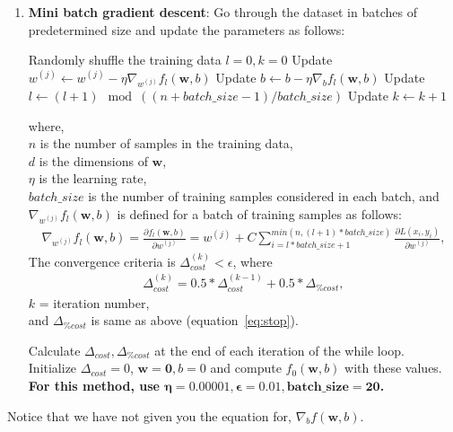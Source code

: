 \begin{enumerate}
\item  \textbf{Mini batch gradient descent}: Go through the dataset in batches of predetermined size and update the parameters as follows:
\begin{algorithmic}
\STATE Randomly shuffle the training data
\STATE $l = 0, k = 0$
\STATE Update $w^{(j)} \leftarrow w^{(j)} - \eta \nabla_{w^{(j)}} f_{l}(\mathbf{w},b)$
\ENDFOR
\STATE Update $b \leftarrow b - \eta \nabla_{b} f_{l}(\mathbf{w},b)$
\STATE Update $l \leftarrow (l + 1) \mod ((n+batch\_size -1)/batch\_size)$
\STATE Update $k \leftarrow k+1$
\ENDWHILE
\end{algorithmic}
where,\\
$n$ is the number of samples in the training data,\\
 $d$ is the dimensions of $\mathbf{w}$, \\
 $\eta$ is the learning rate, \\ 
  $batch\_size$ is the number of training samples considered in each batch, and\\
 $\nabla_{w^{(j)}} f_{l}(\mathbf{w},b)$ is defined for a batch of training samples as follows:
\begin{align*}
\nabla_{w^{(j)}} f_{l}(\mathbf{w},b)  = \frac{\partial f_{l}(\mathbf{w},b)}{\partial w^{(j)}} = w^{(j)} + C \sum_{i = l*batch\_size + 1}^{min(n, (l+1)*batch\_size)} \frac{\partial L(x_i, y_i)}{\partial w^{(j)}},
\end{align*} 
The convergence criteria is $\Delta_{cost}^{(k)} < \epsilon$, where  
\begin{align*}
\Delta_{cost}^{(k)} = 0.5*\Delta_{cost}^{(k-1)} + 0.5*\Delta_{\% cost},
\end{align*}  
$k$ = iteration number,\\  
and  $\Delta_{\% cost}$ is same as above (equation~\ref{eq:stop}). 

Calculate $\Delta_{cost}, \Delta_{\% cost}$ at the end of each iteration of the while loop. \\
Initialize $\Delta_{cost} = 0$, $\mathbf{w = 0}, b = 0$ and compute $f_{0}(\mathbf{w}, b)$ with these values.\\
\textbf{For this method, use $\mathbf{\eta = 0.00001, \epsilon = 0.01, batch\_size = 20}$.}
\end{enumerate}

Notice that we have not given you the equation for, $\nabla_{b} f(\mathbf{w},b)$.

